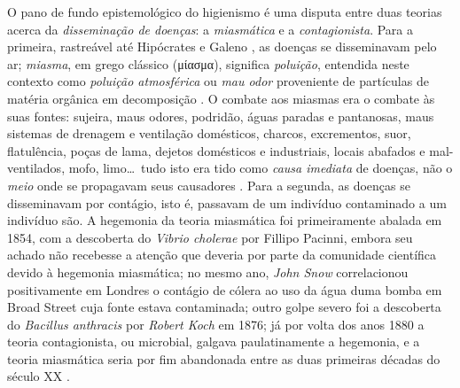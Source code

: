 O pano de fundo epistemológico do higienismo é uma disputa entre duas teorias acerca da \textit{disseminação de doenças}: a \textit{miasmática} e a \textit{contagionista}. Para a primeira, rastreável até Hipócrates e Galeno \cite{sterner_miasmic_2007}, as doenças se disseminavam pelo ar; \textit{miasma}, em grego clássico (\textgreek{μίασμα}), significa \textit{poluição}, entendida neste contexto como \textit{poluição atmosférica} ou \textit{mau odor} proveniente de partículas de matéria orgânica em decomposição \cite{mehlhorn2008encyclopedia}. O combate aos miasmas era o combate às suas fontes: sujeira, maus odores, podridão, águas paradas e pantanosas, maus sistemas de drenagem e ventilação domésticos, charcos, excrementos, suor, flatulência, poças de lama, dejetos domésticos e industriais, locais abafados e mal-ventilados, mofo, limo\dots\ tudo isto era tido como \textit{causa imediata} de doenças, não o \textit{meio} onde se propagavam seus causadores \cite{baldwin_air_2003,halliday_miaslond_2001}. Para a segunda, as doenças se disseminavam por contágio, isto é, passavam de um indivíduo contaminado a um indivíduo são. A hegemonia da teoria miasmática foi primeiramente abalada em 1854, com a descoberta do \textit{Vibrio cholerae} por Fillipo Pacinni, embora seu achado não recebesse a atenção que deveria por parte da comunidade científica devido à hegemonia miasmática; no mesmo ano, \textit{John Snow} correlacionou positivamente em Londres o contágio de cólera ao uso da água duma bomba em Broad Street cuja fonte estava contaminada; outro golpe severo foi a descoberta do \textit{Bacillus anthracis} por \textit{Robert Koch} em 1876; já por volta dos anos 1880 a teoria contagionista, ou microbial, galgava paulatinamente a hegemonia, e a teoria miasmática seria por fim abandonada entre as duas primeiras décadas do século XX \cite{bynum_histmed_2011,mehlhorn2008encyclopedia}.

